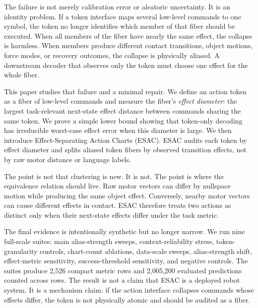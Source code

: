 \documentclass{article}
\begin{document}
The failure is not merely calibration error or aleatoric uncertainty. It is an
identity problem. If a token interface maps several low-level commands to one
symbol, the token no longer identifies which member of that fiber should be
executed. When all members of the fiber have nearly the same effect, the
collapse is harmless. When members produce different contact transitions,
object motions, force modes, or recovery outcomes, the collapse is physically
aliased. A downstream decoder that observes only the token must choose one
effect for the whole fiber.

This paper studies that failure and a minimal repair. We define an action token
as a fiber of low-level commands and measure the fiber's \emph{effect diameter}:
the largest task-relevant next-state effect distance between commands sharing
the same token. We prove a simple lower bound showing that token-only decoding
has irreducible worst-case effect error when this diameter is large. We then
introduce Effect-Separating Action Charts (ESAC). ESAC audits each token by
effect diameter and splits aliased token fibers by observed transition effects,
not by raw motor distance or language labels.

The point is not that clustering is new. It is not. The point is where the
equivalence relation should live. Raw motor vectors can differ by nullspace
motion while producing the same object effect. Conversely, nearby motor vectors
can cause different effects in contact. ESAC therefore treats two actions as
distinct only when their next-state effects differ under the task metric.

The final evidence is intentionally synthetic but no longer narrow. We run nine
full-scale suites: main alias-strength sweeps, context-reliability stress,
token-granularity controls, chart-count ablations, data-scale sweeps,
alias-strength shift, effect-metric sensitivity, success-threshold sensitivity,
and negative controls. The suites produce 2,526 compact metric rows and
2,005,200 evaluated predictions counted across rows. The result is not a claim
that ESAC is a deployed robot system. It is a mechanism claim: if the action
interface collapses commands whose effects differ, the token is not physically
atomic and should be audited as a fiber.
\end{document}
